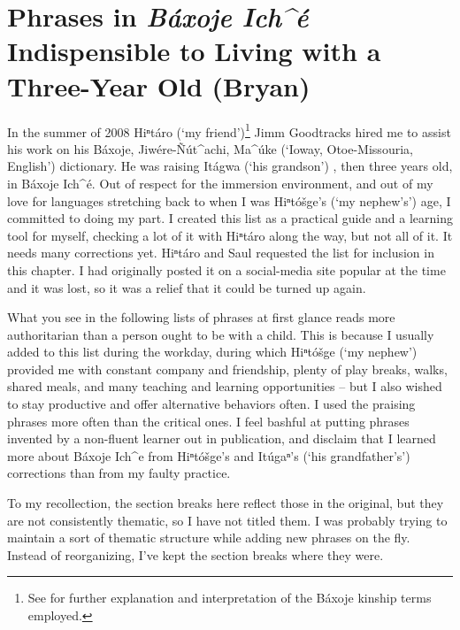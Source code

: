 \documentclass[output=paper]{LSP/langsci}
\begin{document}
\section{Phrases in \emph{Báxoje Ich\^{ }é} Indispensible to Living with a Three-Year Old (Bryan)}
	In the summer of 2008 Hiⁿtáro (`my friend')\footnote{See  for further explanation and interpretation of the Báxoje kinship terms employed.} Jimm Goodtracks hired me to assist his work on his Báxoje, Jiwére-\~Nút\^{ }achi, Ma\^{ }úke (`Ioway, Otoe-Missouria, English') dictionary. He was raising Itágwa (`his grandson') , then three years old, in Báxoje Ich\^{ }é. Out of respect for the immersion environment, and out of my love for languages stretching back to when I was Hiⁿtóšge's (`my nephew's') age, I committed to doing my part. I created this list as a practical guide and a learning tool for myself, checking a lot of it with Hiⁿtáro along the way, but not all of it. It needs many corrections yet. Hiⁿtáro and Saul requested the list for inclusion in this chapter. I had originally posted it on a social-media site popular at the time and it was lost, so it was a relief that it could be turned up again. 

What you see in the following lists of phrases
at first glance reads more authoritarian than a person ought to be with a child. This is because I usually added to this list during the workday, during which Hiⁿtóšge (`my nephew') provided me with constant company and friendship, plenty of play breaks, walks, shared meals, and many teaching and learning opportunities -- but I also wished to stay productive and offer alternative behaviors often. I used the praising phrases more often than the critical ones. I feel bashful at putting phrases invented by a non-fluent learner out in publication, and disclaim that I learned more about Báxoje Ich\^{ }e from Hiⁿtóšge's and Itúgaⁿ's (`his grandfather's') corrections than from my faulty practice. 

To my recollection, the section breaks here reflect those in the original, but they are not consistently thematic, so I have not titled them. I was probably trying to maintain a sort of thematic structure while adding new phrases on the fly. Instead of reorganizing, I've kept the section breaks where they were.

\end{document}
